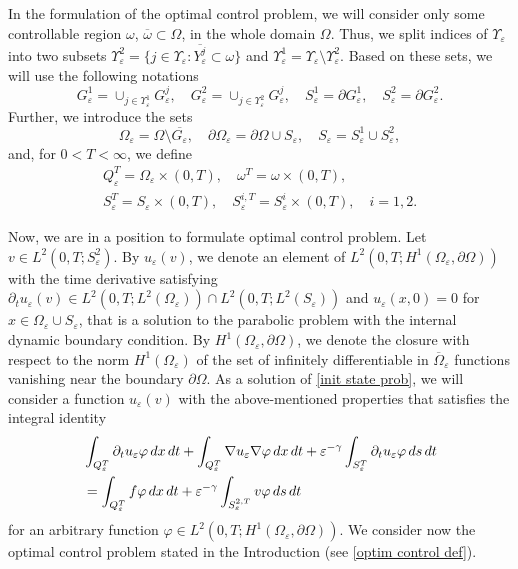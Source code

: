 \documentclass[reqno]{amsart}
\begin{document}
In the formulation of the optimal control problem, we will consider only
some controllable region $\omega$, $\overline{\omega}\subset \Omega$, in the
whole domain $\Omega$. Thus, we split indices of $\Upsilon_\varepsilon$ into
two subsets $\Upsilon^2_{\varepsilon}=\{j\in \Upsilon_{\varepsilon}:
\overline{Y^{j}_{\varepsilon}}\subset \omega \}$ and 
$\Upsilon^{1}_\varepsilon = \Upsilon_\varepsilon \setminus \Upsilon^2_\varepsilon$.
Based on these sets, we will use the following notations
\[
G_{\varepsilon}^{1}=\cup_{j\in \Upsilon^{1}_{\varepsilon}}{G^{j}_{\varepsilon}},\quad
G_{\varepsilon}^2=\cup_{j\in
\Upsilon^2_{\varepsilon}}{G^{j}_{\varepsilon}}, \quad 
S^{1}_\varepsilon = \partial G^{1}_\varepsilon,\quad
S^2_\varepsilon = \partial G^2_\varepsilon.
\]
Further, we introduce the sets
\[
\Omega_{\varepsilon}=\Omega \setminus \overline{G_{\varepsilon}},\quad
\partial \Omega_{\varepsilon}=\partial \Omega \cup S_{\varepsilon},\quad
S_{\varepsilon}=S_{\varepsilon}^{1}\cup S_{\varepsilon}^2,
\]
and, for $0<T<\infty$, we define
\begin{gather*}
Q^{T}_{\varepsilon}=\Omega_{\varepsilon}\times (0,T),\quad
 \omega^{T}=\omega \times (0,T), \\
S_{\varepsilon}^{T}=S_{\varepsilon}\times(0,T),\quad
S_{\varepsilon}^{i,T}=S_{\varepsilon}^{i}\times (0,T),\quad i=1,2.
\end{gather*}

Now, we are in a position to formulate optimal control problem. 
Let $v\in L^2(0,T;S_{\varepsilon }^2)$. By $u_{\varepsilon }(v)$, we denote an
element of $L^2(0,T;H^{1}(\Omega _{\varepsilon },\partial \Omega ))$ with
the time derivative satisfying $\partial _{t}u_{\varepsilon }(v)\in
L^2(0,T;L^2(\Omega _{\varepsilon }))\cap
L^2(0,T;L^2(S_{\varepsilon }))$ and $u_{\varepsilon }(x,0)=0$ for $x\in
\Omega _{\varepsilon }\cup S_{\varepsilon }$, that is a solution to the
parabolic problem with the internal dynamic boundary condition. By $%
H^{1}(\Omega _{\varepsilon },\partial \Omega )$, we denote the closure with
respect to the norm $H^{1}(\Omega _{\varepsilon })$ of the set of infinitely
differentiable in $\overline{\Omega }_{\varepsilon }$ functions vanishing
near the boundary $\partial \Omega $. As a solution of
\eqref{init state prob}, we will consider a function $u_{\varepsilon }(v)$ with the
above-mentioned properties that satisfies the  integral identity
\begin{equation}
\begin{aligned}
&\int _{Q_{\varepsilon }^{T}}\partial _{t}u_{\varepsilon }\varphi {\,dx\,dt%
}+\int _{Q_{\varepsilon }^{T}}\nabla u_{\varepsilon }\nabla \varphi {%
\,dx\,dt}+\varepsilon ^{-\gamma }\int _{S_{\varepsilon }^{T}}\partial
_{t}u_{\varepsilon }\varphi \,ds\,dt \\
&=\int _{Q_{\varepsilon
}^{T}}f\varphi\,dx\,dt+\varepsilon ^{-\gamma }\int _{S_{\varepsilon
}^{2,T}}v\varphi \,ds\,dt
\end{aligned}  \label{int ident u}
\end{equation}
for an arbitrary function $\varphi \in L^2(0,T;H^{1}(\Omega _{\varepsilon
},\partial \Omega ))$. We consider now the optimal control problem stated in
the Introduction (see \eqref{optim control def}).
\end{document}
